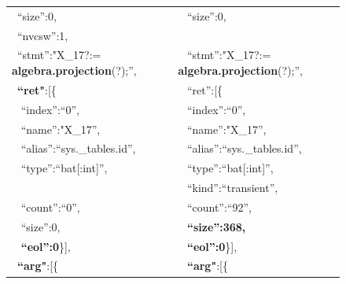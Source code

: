 \documentclass[conference]{IEEEtran}
\begin{document}
\begin{figure}[t]
{\begin{tabular}{|l@{~}l|}
 ~``size'':0,                                             &   ~ ``size'':0,                                              \\
 ~{\color{red}``nvcsw'':1,}                               &   ~                                                          \\
 ~``stmt'':"X\_17?:= \textbf{algebra.projection}(?);'',   &   ~ ``stmt'':"X\_17?:= \textbf{algebra.projection}(?);'',    \\
 ~\textbf{``ret"}:[\{                                     &   ~ ``ret'':[\{                                              \\
 ~   ``index'':``0'',                                     &   ~    ``index'':``0'',                                      \\
 ~   ``name'':"X\_17'',                                   &   ~    ``name'':"X\_17'',                                    \\
 ~   ``alias'':``sys.\_tables.id'',                       &   ~    ``alias'':``sys.\_tables.id'',                        \\
 ~   ``type'':``bat[:int]'',                              &   ~    ``type'':``bat[:int]'',                               \\
 ~                                                        &   ~ {\color{red}``kind'':``transient'',}                     \\
 ~   {\color{red}``count'':``0'',}                        &   ~    {\color{red}``count'':``92'',}                        \\
 ~   {\color{red}``size'':0,}                             &   ~    \textbf{\color{red}``size'':368,}                     \\
 ~   \textbf{``eol'':0}\}],                               &   ~    \textbf{``eol'':0}\}],                                \\
 ~\textbf{``arg"}:[\{                                     &   ~ \textbf{``arg"}:[\{                                      \\

\end{tabular}}
\end{figure}
\end{document}
